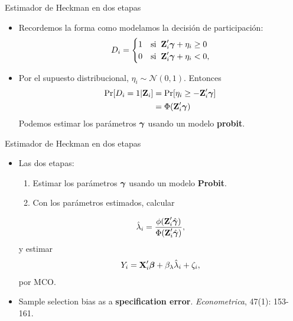 \documentclass[10pt, xcolor=dvipsnames]{beamer}
\begin{document}
\begin{frame}{Estimador de Heckman en dos etapas}
	\begin{itemize}\setlength{\itemsep}{1em}
		\item Recordemos la forma como modelamos la decisión de participación:
		\begin{align*}
			D_i = 
			\begin{cases}
				1 & \text{si} \hspace{0.2cm} \textbf{Z}'_i\boldsymbol{\gamma} + \eta_i \geq 0 \\		
				0 & \text{si} \hspace{0.2cm} \textbf{Z}'_i\boldsymbol{\gamma} + \eta_i < 0,
			\end{cases}
		\end{align*}
	\item Por el supuesto distribucional, $\eta_i \sim \mathcal{N} \left(0,1\right)$. Entonces
		\begin{align*}
			\begin{split}
				\Pr[D_i = 1|\textbf{Z}_i] &= \Pr[\eta_i\geq-\textbf{Z}'_i\boldsymbol{\gamma}] \\
				&= \Phi(\textbf{Z}'_i\boldsymbol{\gamma})
			\end{split}
		\end{align*}
		Podemos estimar los parámetros $\boldsymbol{\gamma}$ usando un modelo \textbf{probit}. 
	\end{itemize}
\end{frame}


\begin{frame}{Estimador de Heckman en dos etapas}
\begin{itemize}
	\item Las dos etapas: \vspace{0.1cm}
\begin{enumerate}
	\item Estimar los parámetros $\boldsymbol{\gamma}$ usando un modelo \textbf{Probit}. \\ \vspace{0.1cm}
	\item Con los parámetros estimados, calcular 
\end{enumerate}
    \begin{align*}
        \hat{\lambda}_i = \frac{\phi(\textbf{Z}'_i\hat{\boldsymbol{\gamma}})}{\Phi(\textbf{Z}'_i\hat{\boldsymbol{\gamma}})},
    \end{align*}
    y estimar 
    \begin{align*}
        Y_i = \textbf{X}'_i\boldsymbol{\beta} + \beta_{\lambda} \hat{\lambda}_i  + \zeta_i,
    \end{align*}
    por MCO. \\ \vspace{0.1cm}
    \item \citet{Heckman} Sample selection bias as a \textbf{specification error}. \textit{Econometrica}, 47(1): 153-161. 
    \end{itemize}
\end{frame}
\end{document}
